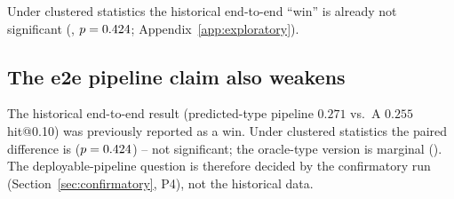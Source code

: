 \newcommand{\expetoe}{%
\subsection{The e2e pipeline claim also weakens}

The historical end-to-end result (predicted-type pipeline $0.271$ vs.\ A
$0.255$ hit@0.10) was previously reported as a win. Under clustered
statistics the paired difference is \ExpEtoEPredvsA{}
($p=\ExpEtoEPredvsAp$) -- not significant; the oracle-type version is
marginal (\ExpEtoEOraclevsA). The deployable-pipeline question is
therefore decided by the confirmatory run
(Section~\ref{sec:confirmatory}, P4), not the historical data.
}
\ifworkshopbuild Under clustered statistics the historical end-to-end ``win'' is already
not significant (\ExpEtoEPredvsA{}, $p=0.424$;
Appendix~\ref{app:exploratory}).
\else\expetoe\fi

